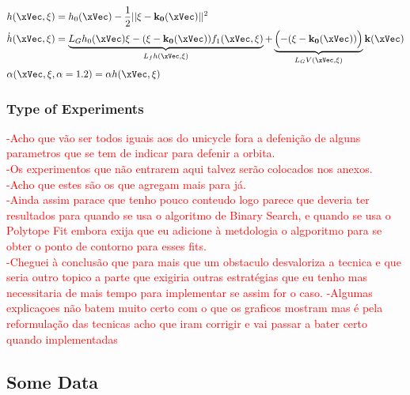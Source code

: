 \begin{subequations}
   \begin{align}
    &h(\xVec, \xi) = h_0(\xVec) -  \frac{1}{2} || \xi - \mathbf{k_0(\xVec)}||^2 \label{eq:h_orbital} \\
    &\dot{h}(\xVec, \xi) = \underbrace{L_Gh_0(\xVec)\xi - (\xi - \mathbf{k_0(\xVec)})f_1(\xVec, \xi)}_{L_fh(\xVec, \xi)} + \underbrace{ \Bigl(  - (\xi - \mathbf{k_0(\xVec)})\Bigr)}_{L_GV(\xVec, \xi)}  \mathbf{k}(\xVec)  \label{eq:dot_h_orbital} \\
    &\alpha(\xVec, \xi, \alpha = 1.2)  = \alpha h(\xVec, \xi) \label{eq:CBF_alpha_orbital}
\end{align}
\label{eq:CBF_orbital}
\end{subequations}




\subsubsection{Type of Experiments}
\label{subsubsec:orbital_type_of_experiments}



\textcolor{red}{-Acho que vão ser todos iguais aos do unicycle fora a defenição de alguns parametros que se tem de indicar para defenir a orbita.\\
-Os experimentos que não entrarem aqui talvez serão colocados nos anexos. \\
-Acho que estes são os que agregam mais para já.\\
-Ainda assim parace que tenho pouco conteudo logo parece que deveria ter resultados para quando se usa o algoritmo de Binary Search, e quando se usa o Polytope Fit embora exija que eu adicione à metdologia o algporitmo para se obter o ponto de contorno para esses fits.\\
-Cheguei à conclusão que para mais que um obstaculo desvaloriza a tecnica e que seria outro topico a parte que exigiria outras estratégias que eu tenho mas necessitaria de mais tempo para implementar se assim for o caso. 
-Algumas explicaçoes não batem muito certo com o que os graficos mostram mas é pela reformulação das tecnicas acho que iram corrigir e vai passar a bater certo quando implementadas
}

\subsection{Some Data}
\label{subsec:some_data}

